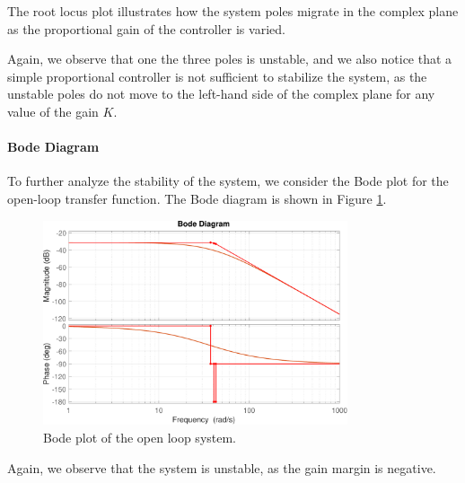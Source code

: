 The root locus plot illustrates how the system poles migrate in the complex plane as the proportional gain of the controller is varied.

Again, we observe that one the three poles is unstable, and we also notice that a simple proportional controller is not sufficient to stabilize the system, as the unstable poles do not move to the left-hand side of the complex plane for any value of the gain $K$.

\paragraph{Bode Diagram}

To further analyze the stability of the system, we consider the Bode plot for the open-loop transfer function.
The Bode diagram is shown in Figure \ref{fig:bode_plot}.

\begin{figure}[H]
    \centering
    \includegraphics[width=0.8\textwidth]{./img/MATLAB/analysis/bode_plot.pdf}
    \caption{Bode plot of the open loop system.}
    \label{fig:bode_plot}
\end{figure}

Again, we observe that the system is unstable, as the gain margin is negative.